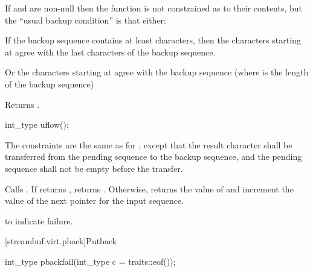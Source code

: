 \begin{itemdescr}
\pnum
If
and
are non-null then the function is not constrained as to their contents, but the ``usual backup condition'' is that either:
\begin{enumeratea}
\item
If the backup sequence contains at least
characters, then the
characters starting at
agree with the last
characters of the backup sequence.
\item
Or the  characters starting at
agree with the backup sequence (where  is the length of the backup sequence)
\end{enumeratea}

\pnum
{}
Returns
.
\end{itemdescr}

%
\begin{itemdecl}
int_type uflow();
\end{itemdecl}

\begin{itemdescr}
\pnum
\requires
The constraints are the same as for
,
except that the result character shall be transferred from the pending
sequence to the backup sequence, and the pending sequence shall not
be empty before the transfer.

\pnum
{}
Calls
.
If
returns
,
returns
.
Otherwise, returns the value of
and increment the value of the next pointer for the input sequence.

\pnum
\returns
{}
to indicate failure.
\end{itemdescr}

[streambuf.virt.pback]{Putback}

%
\begin{itemdecl}
int_type pbackfail(int_type c = traits::eof());
\end{itemdecl}

